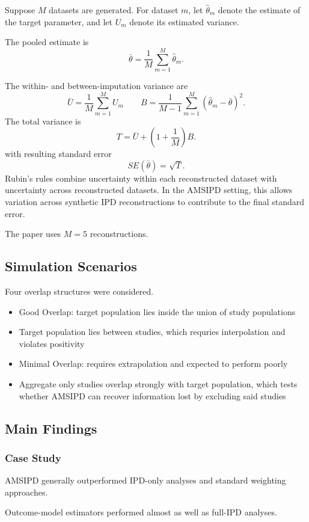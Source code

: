\documentclass[11pt]{article}
\begin{document}
Suppose \(M\) datasets are generated. For dataset \(m\), let $\hat{\theta}_m$ denote the estimate of the target parameter, and let $U_m$ denote its estimated variance.

The pooled estimate is\[\bar{\theta}=\frac{1}{M}\sum_{m=1}^{M}\hat{\theta}_m.\]

The within- and between-imputation variance are \[\bar{U}=\frac{1}{M}\sum_{m=1}^{M}U_m \qquad B=\frac{1}{M-1}\sum_{m=1}^{M}(\hat{\theta}_m-\bar{\theta})^2.\]
The total variance is\[T=\bar{U}+\left(1+\frac{1}{M}\right)B.\] with resulting standard error\[SE(\bar{\theta})=\sqrt{T}.\]
Rubin's rules combine uncertainty within each reconstructed dataset with uncertainty across reconstructed datasets. In the AMSIPD setting, this allows variation across synthetic IPD reconstructions to contribute to the final standard error.

The paper uses $M=5$ reconstructions.

\subsection*{Simulation Scenarios}

Four overlap structures were considered.
\begin{itemize}
    \item Good Overlap: target population lies inside the union of study populations
    \item Target population lies between studies, which requries interpolation and violates positivity
    \item Minimal Overlap: requires extrapolation and expected to perform poorly
    \item Aggregate only studies overlap strongly with target population, which tests whether AMSIPD can recover information lost by excluding said studies
\end{itemize}

\subsection*{Main Findings}

\subsubsection*{Case Study}

AMSIPD generally outperformed IPD-only analyses and standard weighting approaches.

Outcome-model estimators performed almost as well as full-IPD analyses.
\end{document}
